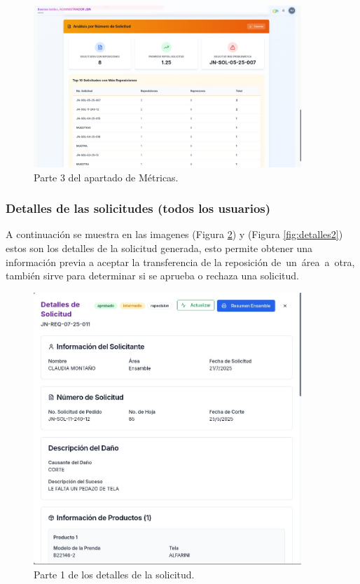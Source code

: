 \documentclass[12pt,letterpaper,spanish]{report}
\begin{document}
\begin{figure}[H]
    \centering
    \includegraphics[width=0.9\textwidth]{metricas3.jpg}
    \caption{Parte 3 del apartado de Métricas.}
    \label{fig:metricas3}
\end{figure}

\subsubsection{Detalles de las solicitudes (todos los usuarios)}
A continuación se muestra en las imagenes (Figura \ref{fig:detalles1}) y (Figura \ref{fig:detalles2}) estos son los detalles de la solicitud generada, esto permite obtener una información previa a aceptar la transferencia de la reposición de un área a otra, también sirve para determinar si se aprueba o rechaza una solicitud.

\begin{figure}[H]
    \centering
    \includegraphics[width=0.9\textwidth]{detalles_rep1.jpg}
    \caption{Parte 1 de los detalles de la solicitud.}
    \label{fig:detalles1}
\end{figure}
\end{document}
